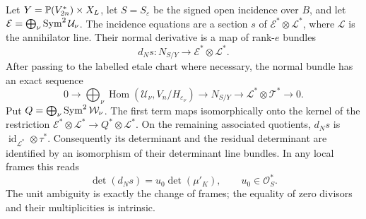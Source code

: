 \begin{proposition}
\label{prop:normal-block-factorization}
Let $Y=\mathbb P(V_{2n}^*)\times X_L$, let $S=S_\varepsilon$ be the
signed open incidence over $B$, and let
$\mathcal E=\bigoplus_\nu\operatorname{Sym}^2\mathcal U_\nu$.
The incidence equations are a section $s$ of
$\mathcal E^*\otimes\mathcal L^*$, where
$\mathcal L$ is the annihilator line. Their normal derivative is a
map of rank-$e$ bundles
\[
 d_Ns:N_{S/Y}\longrightarrow\mathcal E^*\otimes\mathcal L^*.
\]
After passing to the labelled etale chart where necessary, the normal
bundle has an exact sequence
\begin{equation}\label{eq:normal-bundle-sequence}
 0\longrightarrow\bigoplus_\nu\operatorname{Hom}
            (\mathcal U_\nu,V_n/H_{\varepsilon_\nu})
 \longrightarrow N_{S/Y}
 \longrightarrow\mathcal L^*\otimes\mathcal T^*
 \longrightarrow0.
\end{equation}
Put $Q=\bigoplus_\nu\operatorname{Sym}^2\mathcal W_\nu$. The first term
maps isomorphically onto the kernel of the restriction
$\mathcal E^*\otimes\mathcal L^*\to Q^*\otimes\mathcal L^*$.
On the remaining associated quotients, $d_Ns$ is
$\operatorname{id}_{\mathcal L^*}\otimes\tau^*$.
Consequently its determinant and the residual determinant are
identified by an isomorphism of their determinant line bundles.
In any local frames this reads
\begin{equation}\label{eq:normal-unit-identity}
 \det(d_Ns)=u_0\det(\mu'_K),\qquad u_0\in\mathcal O_S^*.
\end{equation}
The unit ambiguity is exactly the change of frames; the equality of
zero divisors and their multiplicities is intrinsic.
\end{proposition}
